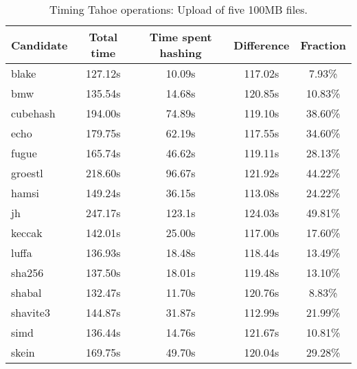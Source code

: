 \begin{table}[h]
  \centering
  \begin{tabular}{ | l | c | c | c | c | }
    \hline
    Candidate & Total time & Time spent hashing & Difference & Fraction \\ \hline
    blake & 127.12s & 10.09s & 117.02s & 7.93\% \\ \hline
    bmw & 135.54s & 14.68s & 120.85s & 10.83\% \\ \hline
    cubehash & 194.00s & 74.89s & 119.10s & 38.60\% \\ \hline
    echo & 179.75s & 62.19s & 117.55s & 34.60\% \\ \hline
    fugue & 165.74s & 46.62s & 119.11s & 28.13\% \\ \hline
    groestl & 218.60s & 96.67s & 121.92s & 44.22\% \\ \hline
    hamsi & 149.24s & 36.15s & 113.08s & 24.22\% \\ \hline
    jh & 247.17s & 123.1s & 124.03s & 49.81\% \\ \hline
    keccak & 142.01s & 25.00s & 117.00s & 17.60\% \\ \hline
    luffa & 136.93s & 18.48s & 118.44s & 13.49\% \\ \hline
    sha256 & 137.50s & 18.01s & 119.48s & 13.10\% \\ \hline
    shabal & 132.47s & 11.70s & 120.76s & 8.83\% \\ \hline
    shavite3 & 144.87s & 31.87s & 112.99s & 21.99\% \\ \hline
    simd & 136.44s & 14.76s & 121.67s & 10.81\% \\ \hline
    skein & 169.75s & 49.70s & 120.04s & 29.28\% \\ \hline
  \end{tabular}
  \caption{Timing Tahoe operations: Upload of five 100MB files.}
  \label{tbl:hashingtimes:put100mb}
\end{table}

